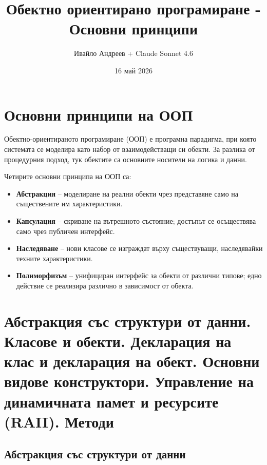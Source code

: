 \documentclass{scrartcl}
\title{Обектно ориентирано програмиране - Основни принципи}
\author{Ивайло Андреев + Claude Sonnet 4.6}
\date{16 май 2026}
\begin{document}
\maketitle

\tableofcontents

\newpage

\begin{FlushLeft}

\section{Основни принципи на ООП}

Обектно-ориентираното програмиране (ООП) е програмна парадигма, при която системата се моделира като набор от взаимодействащи си обекти. За разлика от процедурния подход, тук обектите са основните носители на логика и данни.

Четирите основни принципа на ООП са:
\begin{itemize}
    \item \textbf{Абстракция} -- моделиране на реални обекти чрез представяне само на съществените им характеристики.
    \item \textbf{Капсулация} -- скриване на вътрешното състояние; достъпът се осъществява само чрез публичен интерфейс.
    \item \textbf{Наследяване} -- нови класове се изграждат върху съществуващи, наследявайки техните характеристики.
    \item \textbf{Полиморфизъм} -- унифициран интерфейс за обекти от различни типове; едно действие се реализира различно в зависимост от обекта.
\end{itemize}

\section{Абстракция със структури от данни. Класове и обекти.
Декларация на клас и декларация на обект. Основни видове конструктори.
Управление на динамичната памет и ресурсите (RAII). Методи}

\subsection{Абстракция със структури от данни}


\end{FlushLeft}
\end{document}
